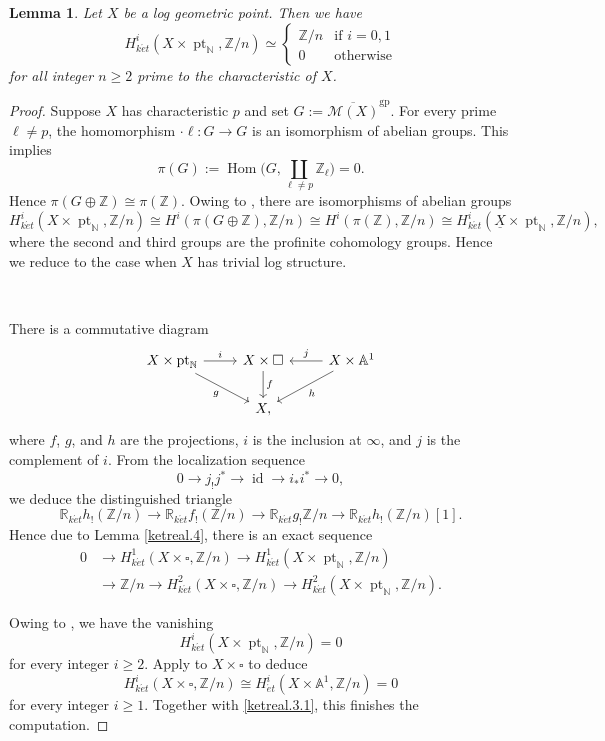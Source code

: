 \documentclass[11pt, a4paper]{amsart}
\newtheorem{lem}[thm]{Lemma}
\theoremstyle{definition}
\numberwithin{equation}{subsection}
\newcommand{\N}{\mathbb{N}}
\newcommand{\Z}{\mathbb{Z}}
\newcommand{\R}{\mathbb{R}}
\newcommand{\A}{\mathbb{A}}
\newcommand{\id}{\operatorname{id}}   			%
\renewcommand{\hom}{\operatorname{Hom}}				 %
\newcommand{\pt}[1]{\mathrm{\pt}_{#1}}
\newcommand{\ol}{\overline}
\renewcommand{\ul}{\underline}
\newcommand{\gp}{{\mathrm{gp}}}
\newcommand{\et}{{\acute{e}t}}
\newcommand{\cM}{\mathcal{M}}
\newcommand{\boxx}{\square}
\def\pt{\operatorname{pt}}
\begin{document}
\begin{lem}
\label{ketreal.3}
Let $X$ be a log geometric point.
Then we have
\[
H_{k\et}^i(X\times \pt_\N, \Z/n)
\simeq
\left\{
\begin{array}{ll}
\Z/n &
\text{if }i=0,1
\\
0 & \text{otherwise}
\end{array}
\right.
\]
for all integer $n\geq 2$ prime to the characteristic of $X$.
\end{lem}
\begin{proof}
Suppose $X$ has characteristic $p$ and set $G:=\ol{\cM(X)}^\gp$.
For every prime $\ell\neq p$, 
the homomorphism $\cdot \ell \colon G\to G$ is an isomorphism of abelian groups.
This implies
\[
\pi(G):=\hom\big( G,\coprod_{\ell\neq p}\Z_{\ell}\big) =0.
\]
Hence $\pi(G\oplus \Z) \cong \pi(\Z)$.
Owing to \cite[Proposition 1.2]{NakayamaII}, there are isomorphisms of abelian groups
\[
H_{k\et}^i(X\times \pt_\N, \Z/n)
\cong
H^i(\pi(G\oplus \Z),\Z/n)
\cong
H^i(\pi(\Z),\Z/n)
\cong
H_{k\et}^i(\ul{X}\times \pt_\N, \Z/n),
\]
where the second and third groups are the profinite cohomology groups.
Hence we reduce to the case when $X$ has trivial log structure.

\ 

There is a commutative diagram
\[
\begin{tikzcd}
X\times \pt_\N\ar[r,"i"]\ar[rd,"g"']&
X\times \boxx\ar[d,"f"]&
X\times \A^1\ar[l,"j"']\arrow[ld,"h"]
\\
&
X,
\end{tikzcd}
\]
where $f$, $g$, and $h$ are the projections, $i$ is the inclusion at $\infty$, and $j$ is the complement of $i$.
From the localization sequence \cite[\S 2.8(4)]{MR1457738}
\[
0\to j_! j^* \to \id \to i_*i^* \to 0,
\]
we deduce the distinguished triangle
\[
\R_{k\et} h_! (\Z/n) \to \R_{k\et} f_! (\Z/n) \to \R_{k\et} g_!\Z/n \to \R_{k\et} h_! (\Z/n)[1].
\]
Hence due to Lemma \ref{ketreal.4}, there is an exact sequence
\begin{equation}
\label{ketreal.3.1}
\begin{split}
0 &\to H_{k\et}^1(X\times \boxx,\Z/n) \to  H_{k\et}^1(X\times \pt_\N,\Z/n)
\\
 &\to  \Z/n \to  H_{k\et}^2(X\times \boxx,\Z/n) \to  H_{k\et}^2(X\times \pt_\N,\Z/n).
\end{split}
\end{equation}

Owing to \cite[Proposition 5.3]{MR1457738}, we have the vanishing
\[
H_{k\et}^i(X\times \pt_\N, \Z/n)=0
\]
for every integer $i\geq 2$.
Apply \cite[Theorem 7.4]{MR1922832} to $X\times \boxx$ to deduce 
\[
H_{k\et}^i(X\times \boxx,\Z/n)
\cong
H_{\et}^i(X\times \A^1,\Z/n)
=
0
\]
for every integer $i\geq 1$.
Together with \eqref{ketreal.3.1}, this finishes the computation.
\end{proof}
\end{document}
